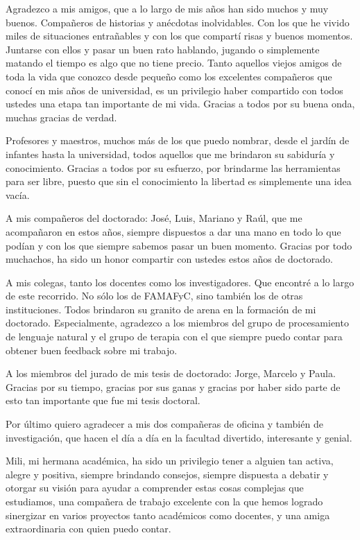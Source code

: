 \documentclass[
11pt, %
english, %
onehalfspacing, %
nolistspacing, %
headsepline, %
consistentlayout, %
]{MastersDoctoralThesis} %
\begin{document}
\begin{acknowledgements}
  Agradezco a mis amigos, que a lo largo de mis años han sido muchos y muy
  buenos.  Compañeros de historias y anécdotas inolvidables. Con los que he
  vivido miles de situaciones entrañables y con los que compartí risas y buenos
  momentos.  Juntarse con ellos y pasar un buen rato hablando, jugando o
  simplemente matando el tiempo es algo que no tiene precio.  Tanto aquellos
  viejos amigos de toda la vida que conozco desde pequeño como los excelentes
  compañeros que conocí en mis años de universidad, es un privilegio haber
  compartido con todos ustedes una etapa tan importante de mi vida. Gracias a
  todos por su buena onda, muchas gracias de verdad.

  Profesores y maestros, muchos más de los que puedo nombrar, desde el jardín
  de infantes hasta la universidad, todos aquellos que me brindaron su
  sabiduría y conocimiento. Gracias a todos por su esfuerzo, por brindarme las
  herramientas para ser libre, puesto que sin el conocimiento la libertad es
  simplemente una idea vacía.

  A mis compañeros del doctorado: José, Luis, Mariano y Raúl, que me
  acompañaron en estos años, siempre dispuestos a dar una mano en todo lo que
  podían y con los que siempre sabemos pasar un buen momento.  Gracias por todo
  muchachos, ha sido un honor compartir con ustedes estos años de doctorado.

  A mis colegas, tanto los docentes como los investigadores. Que encontré a lo
  largo de este recorrido. No sólo los de FAMAFyC, sino también los de otras
  instituciones. Todos brindaron su granito de arena en la formación de mi
  doctorado.  Especialmente, agradezco a los miembros del grupo de
  procesamiento de lenguaje natural y el grupo de terapia con el que siempre
  puedo contar para obtener buen feedback sobre mi trabajo.

  A los miembros del jurado de mis tesis de doctorado: Jorge, Marcelo y Paula.
  Gracias por su tiempo, gracias por sus ganas y gracias por haber sido parte
  de esto tan importante que fue mi tesis doctoral.

  Por último quiero agradecer a mis dos compañeras de oficina y también de
  investigación, que hacen el día a día en la facultad divertido, interesante y
  genial.

  Mili, mi hermana académica, ha sido un privilegio tener a alguien tan activa,
  alegre y positiva, siempre brindando consejos, siempre dispuesta a debatir y
  otorgar su visión para ayudar a comprender estas cosas complejas que
  estudiamos, una compañera de trabajo excelente con la que hemos logrado
  sinergizar en varios proyectos tanto académicos como docentes, y una amiga
  extraordinaria con quien puedo contar.


\end{acknowledgements}
\end{document}
